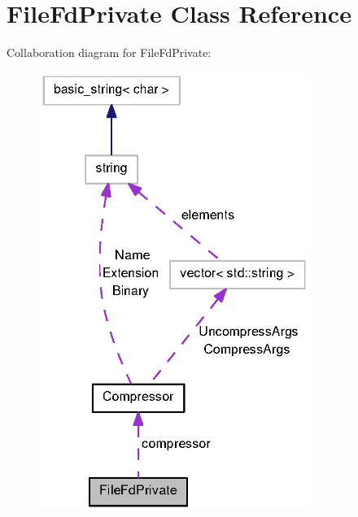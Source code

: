 \section{\-File\-Fd\-Private \-Class \-Reference}
\label{classFileFdPrivate}


\-Collaboration diagram for \-File\-Fd\-Private\-:
\nopagebreak
\begin{figure}[H]
\begin{center}
\leavevmode
\includegraphics[width=249pt]{classFileFdPrivate__coll__graph}
\end{center}
\end{figure}
